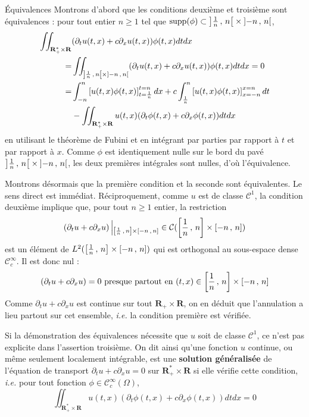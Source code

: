         \begin{demo}{Équivalences}
            Montrons d’abord que les conditions deuxième et troisième sont équivalences : pour tout entier $n \geq 1$ tel que $\text{supp}(\phi) \subset \left] \frac{1}{n} \, , \, n \right[ \times \left] -n \, , \, n \right[$, 
            \begin{align*}
                \iint_{\mathbf{R}_+^* \times \mathbf{R}} & (\partial_t u(t,x) + c \partial_x u(t,x))\phi(t,x) dt dx  \\
                =& \iint_{\left] \frac{1}{n} \, , \, n \right[ \times \left] -n \, , \, n \right[}  (\partial_t u(t,x) + c \partial_x u(t,x))\phi(t,x) dt dx = 0 \\
                =& \int^{n}_{-n} \left[u(t,x)\phi(t,x)\right]_{t = \frac{1}{n}}^{t = n} dx + c \int_{\frac{1}{n}}^{n} \left[u(t,x) \phi(t,x)\right]_{x=-n}^{x = n} dt \\
                &- \iint_{\mathbf{R}_+^* \times \mathbf{R}} u(t,x)(\partial_t \phi(t,x) + c \partial_x \phi(t,x)) dt dx
            \end{align*}
            en utilisant le théorème de Fubini et en intégrant par parties par rapport à $t$ et par rapport à $x$. Comme $\phi$ est identiquement nulle sur le bord du pavé $\left] \frac{1}{n} \, , \, n \right[ \times \left] -n \, , \, n \right[$, les deux premières intégrales sont nulles, d’où l’équivalence. 

            Montrons désormais que la première condition et la seconde sont équivalentes. Le sens direct est immédiat. Réciproquement, comme $u$ est de  classe $\mathcal{C}^1$, la condition deuxième implique que, pour tout $n \geq 1$ entier, la restriction
            \[ \left(\partial_t u + c \partial_x u\right) \Big|\vphantom{\big|}_{\left[ \frac{1}{n} \, , \, n \right] \times \left[ -n \, , \, n \right]} \in \mathcal{C}(\left[ \frac{1}{n} \, , \, n \right] \times \left[ -n \, , \, n \right]) \]
            est un élément de $L^2(\left[ \frac{1}{n} \, , \, n \right] \times \left[ -n \, , \, n \right])$ qui est orthogonal au sous-espace dense $\mathcal{C}_c^{\infty}$. Il est donc nul :
            \[ \left(\partial_t u + c \partial_x u\right) = 0 \text{ presque partout en } (t,x) \in \left[ \frac{1}{n} \, , \, n \right] \times \left[ -n \, , \, n \right] \]
            Comme $\partial_t u + c \partial_x u$ est continue sur tout $\mathbf{R}_+ \times \mathbf{R}$, on en déduit que l’annulation a lieu partout sur cet ensemble, \textit{i.e.} la condition première est vérifiée.
        \end{demo}

        Si la démonstration des équivalences nécessite que $u$ soit de classe $\mathcal{C}^1$, ce n’est pas explicite dans l’assertion troisième. On dit ainsi qu’une fonction $u$ continue, ou même seulement localement intégrable, est une \textbf{solution généralisée} de l’équation de transport $\partial_t u + c \partial_x u = 0$ sur $\mathbf{R}_+^* \times \mathbf{R}$ si elle vérifie cette condition, \textit{i.e.} pour tout fonction $\phi \in \mathcal{C}_c^{\infty}(\Omega)$, 
        \[ \iint_{\mathbf{R}_+^* \times \mathbf{R}} u(t,x)(\partial_t \phi(t,x) + c \partial_x \phi(t,x)) dt dx = 0 \] 

